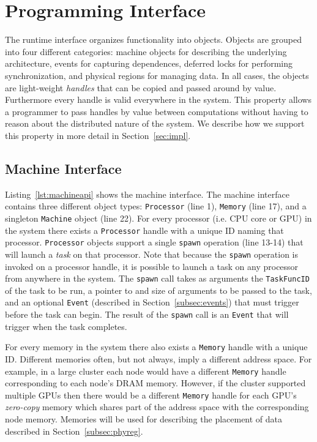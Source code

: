 
\section{Programming Interface}
\label{sec:interface}

The runtime interface organizes
functionality into objects.  Objects are grouped into
four different categories: machine objects for describing
the underlying architecture, events for capturing dependences,
deferred locks for performing synchronization, and physical regions
for managing data.  In all cases, the objects are light-weight
{\em handles} that can be copied and passed around by value.  Furthermore
every handle is valid everywhere in the system.  This property allows 
a programmer to pass handles by value between computations without
having to reason about the distributed nature of the system.
We describe how we support this property in more detail in 
Section~\ref{sec:impl}.

\lstset{
  captionpos=b,
  language=C++,
  basicstyle=\scriptsize,
  numbers=left,
  numberstyle=\tiny,
  columns=fullflexible,
  stepnumber=1,
  escapechar=\#,
  keepspaces=true,
}
\subsection{Machine Interface}
\label{subsec:machmodel}
Listing~\ref{lst:machineapi} shows the machine interface.  The machine interface 
contains three different object types: {\tt Processor} (line 1), {\tt Memory} (line 17), and a 
singleton {\tt Machine} object (line 22).  For every processor (i.e. CPU core or GPU) in 
the system there exists a {\tt Processor} handle with a unique ID naming that processor.  
{\tt Processor} objects support a single {\tt spawn} operation (line 13-14) that will
launch a {\em task} on that processor.  Note that because the {\tt spawn} operation
is invoked on a processor handle, it is possible to launch a task on any
processor from anywhere in the system.  The {\tt spawn} call takes as arguments
the {\tt TaskFuncID} of the task to be run, a pointer to and size of arguments to
be passed to the task, and an optional {\tt Event} (described in Section~\ref{subsec:events})
that must trigger before the task can begin.  The result of the {\tt spawn} call
is an {\tt Event} that will trigger when the task completes. 

For every memory in the system there also exists a {\tt Memory} handle with a unique ID. 
Different memories often, but not always, imply a different address space.  For
example, in a large cluster each node would have a different {\tt Memory} handle
corresponding to each node's DRAM memory.
However, if the cluster supported multiple GPUs then there would be a different
{\tt Memory} handle for each GPU's {\em zero-copy} memory which shares part of the 
address space with the corresponding node memory.  Memories will be used for describing
the placement of data described in Section~\ref{subsec:phyreg}.

